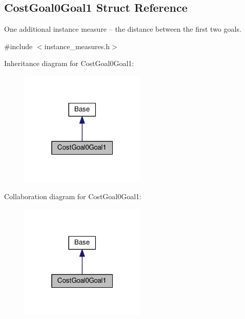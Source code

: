 \hypertarget{structCostGoal0Goal1}{}\subsection{Cost\+Goal0\+Goal1 Struct Reference}
\label{structCostGoal0Goal1}


One additional instance measure -- the distance between the first two goals.  




{\ttfamily \#include $<$instance\+\_\+measures.\+h$>$}



Inheritance diagram for Cost\+Goal0\+Goal1\+:\nopagebreak
\begin{figure}[H]
\begin{center}
\leavevmode
\includegraphics[width=169pt]{structCostGoal0Goal1__inherit__graph}
\end{center}
\end{figure}


Collaboration diagram for Cost\+Goal0\+Goal1\+:\nopagebreak
\begin{figure}[H]
\begin{center}
\leavevmode
\includegraphics[width=169pt]{structCostGoal0Goal1__coll__graph}
\end{center}
\end{figure}
